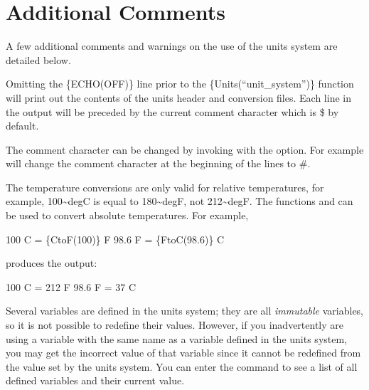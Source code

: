 \section{Additional Comments}

A few additional comments and warnings on the use of the units system are detailed
below.

Omitting the \{ECHO(OFF)\} line prior to the \{Units(``unit\_system'')\}
function will print out the contents of the units header and conversion files.
Each line in the output will be preceded by the current comment character which
is \$ by default.

The comment character can be changed by invoking \aprepro{} with the
 option. For example 
will change the comment character at the beginning of the lines to \#.

The temperature conversions are only valid for relative temperatures, for
example, 100\textasciitilde{}degC is equal to 180\textasciitilde{}degF, not 212\textasciitilde{}degF.
The functions  and  can be used to convert absolute temperatures.  For example,
\begin{apinp}
100 C = \{CtoF(100)\} F
98.6 F = \{FtoC(98.6)\} C
\end{apinp}
produces the output:
\begin{apout}
100 C = 212 F
98.6 F = 37 C
\end{apout}

Several variables are defined in the units system; they are all
\textit{immutable} variables, so it is not possible to
redefine their values.  However, if you inadvertently are using a
variable with the same name as a variable defined in the units system,
you may get the incorrect value of that variable since it cannot be
redefined from the value set by the units system. You can enter the
command  to see a list of all defined variables and their
current value.
